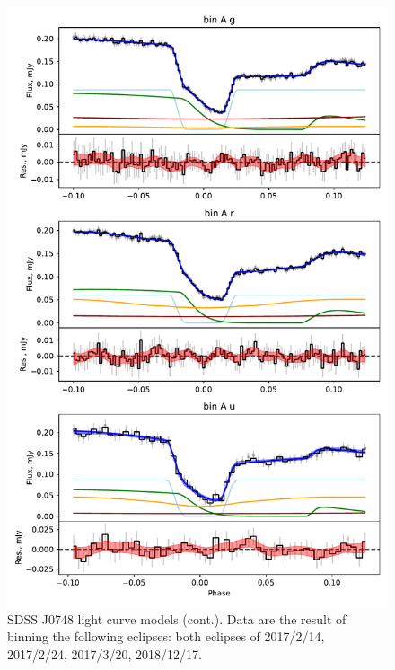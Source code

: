 \begin{figure}
    \centering
    \includegraphics[width=\textwidth]{figures/results/SDSS0748/SDSS0748_2.pdf}
    \caption{SDSS J0748 light curve models (cont.). Data are the result of binning the following eclipses: both eclipses of 2017/2/14, 2017/2/24, 2017/3/20, 2018/12/17.}
    \label{fig:SDSS J0748 all light curves cont 1}
\end{figure}
